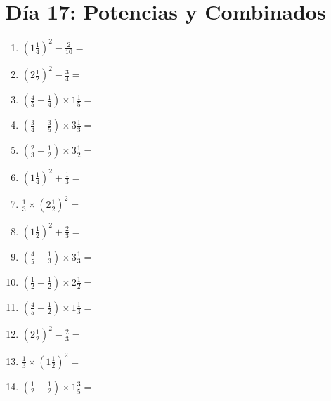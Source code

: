 \documentclass[12pt]{article}
\begin{document}
\section*{Día 17: Potencias y Combinados}
\begin{enumerate}
\item \large $ \left( 1 \frac{1}{4} \right)^2 - \frac{2}{10} = $ \vspace{1.6cm}
\item \large $ \left( 2 \frac{1}{2} \right)^2 - \frac{3}{4} = $ \vspace{1.6cm}
\item \large $ \left( \frac{4}{5} - \frac{1}{4} \right) \times 1 \frac{1}{5} = $ \vspace{1.6cm}
\item \large $ \left( \frac{3}{4} - \frac{3}{5} \right) \times 3 \frac{1}{3} = $ \vspace{1.6cm}
\item \large $ \left( \frac{2}{3} - \frac{1}{2} \right) \times 3 \frac{1}{2} = $ \vspace{1.6cm}
\item \large $ \left( 1 \frac{1}{4} \right)^2 + \frac{1}{3} = $ \vspace{1.6cm}
\item \large $ \frac{1}{3} \times \left( 2 \frac{1}{2} \right)^2 = $ \vspace{1.6cm}
\item \large $ \left( 1 \frac{1}{2} \right)^2 + \frac{2}{3} = $ \vspace{1.6cm}
\item \large $ \left( \frac{4}{5} - \frac{1}{3} \right) \times 3 \frac{1}{3} = $ \vspace{1.6cm}
\item \large $ \left( \frac{1}{2} - \frac{1}{2} \right) \times 2 \frac{1}{2} = $ \vspace{1.6cm}
\newpage
\item \large $ \left( \frac{4}{5} - \frac{1}{2} \right) \times 1 \frac{1}{3} = $ \vspace{1.6cm}
\item \large $ \left( 2 \frac{1}{2} \right)^2 - \frac{2}{3} = $ \vspace{1.6cm}
\item \large $ \frac{1}{3} \times \left( 1 \frac{1}{2} \right)^2 = $ \vspace{1.6cm}
\item \large $ \left( \frac{1}{2} - \frac{1}{2} \right) \times 1 \frac{3}{5} = $ \vspace{1.6cm}

\end{enumerate}
\end{document}
